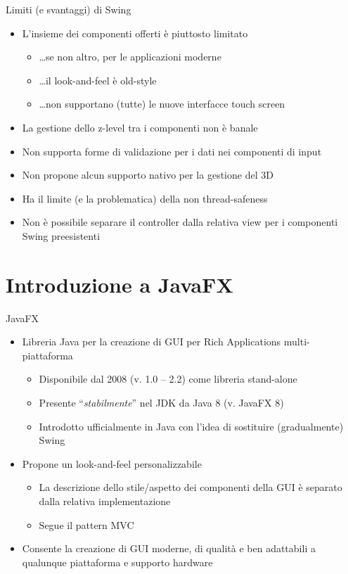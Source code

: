 \documentclass[presentation]{beamer}
\begin{document}
\begin{frame}{Limiti (e svantaggi) di Swing}
\begin{itemize}\itemsep10pt
\item L'insieme dei componenti offerti è piuttosto limitato
\begin{itemize}
\item \dots se non altro, per le applicazioni moderne
\item \dots il look-and-feel è old-style
\item \dots non supportano (tutte) le nuove interfacce touch screen
\end{itemize}
\item La gestione dello z-level tra i componenti non è banale
\item Non supporta forme di validazione per i dati nei componenti di input
\item Non propone alcun supporto nativo per la gestione del 3D
\item Ha il limite (e la problematica) della non thread-safeness
\item Non è possibile separare il controller dalla relativa view per i componenti Swing preesistenti
\end{itemize}
\end{frame}

\section{Introduzione a JavaFX}

\begin{frame}{JavaFX}
\begin{itemize}\itemsep20pt
\item Libreria Java per la creazione di GUI per Rich Applications multi-piattaforma
\begin{itemize}
\item Disponibile dal 2008 (v. 1.0 -- 2.2) come libreria stand-alone
\item Presente ``\emph{stabilmente}'' nel JDK da Java 8 (v. JavaFX 8)
\item Introdotto ufficialmente in Java con l'idea di sostituire (gradualmente) Swing
\end{itemize}
\item Propone un look-and-feel personalizzabile
\begin{itemize}
\item La descrizione dello stile/aspetto dei componenti della GUI è separato dalla relativa implementazione
\item Segue il pattern MVC
\end{itemize}
\item Consente la creazione di GUI moderne, di qualità e ben adattabili a qualunque piattaforma e supporto hardware
\end{itemize}
\end{frame}
\end{document}

